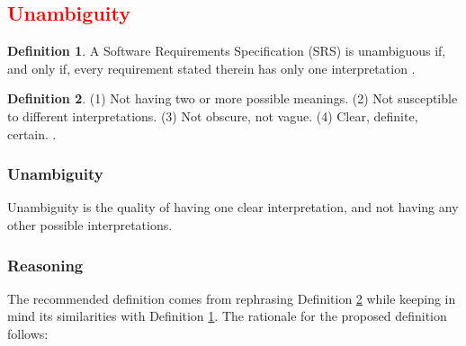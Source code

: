 \documentclass[letterpaper, cleveref]{lipics-v2019}
\newcommand{\authornote}[3]{\textcolor{#1}{[#3 ---#2]}}
\newcommand{\authornote}[3]{}
\newcommand{\wss}[1]{\authornote{blue}{SS}{#1}} %
\newcommand{\notdone}[1]{\textcolor{red}{#1}}
\theoremstyle{definition}
\newtheorem{defn}{Definition}
\begin{document}

\subsection{\notdone{Unambiguity}} %

\begin{defn}
 \label{IEEEunambiguity}A Software Requirements Specification (SRS) is unambiguous if, and only if,
 every requirement stated therein has only one interpretation \citep{IEEE1998}.
\end{defn}

\begin{defn}
	\label{UnambiguitySelected} (1) Not having two or more possible meanings. (2) Not susceptible to different interpretations. (3) Not obscure, not vague. (4) Clear, definite, certain. \citep{FDA2014}.
\end{defn}

\begin{mybox}
\subsubsection*{Unambiguity} 
Unambiguity is the quality of having one clear interpretation, and not having any other possible interpretations.
\end{mybox}

\subsubsection*{Reasoning}

The recommended definition comes from rephrasing Definition \ref{UnambiguitySelected} while keeping in mind its similarities with Definition \ref{IEEEunambiguity}. The rationale for the proposed definition follows:
\end{document}
